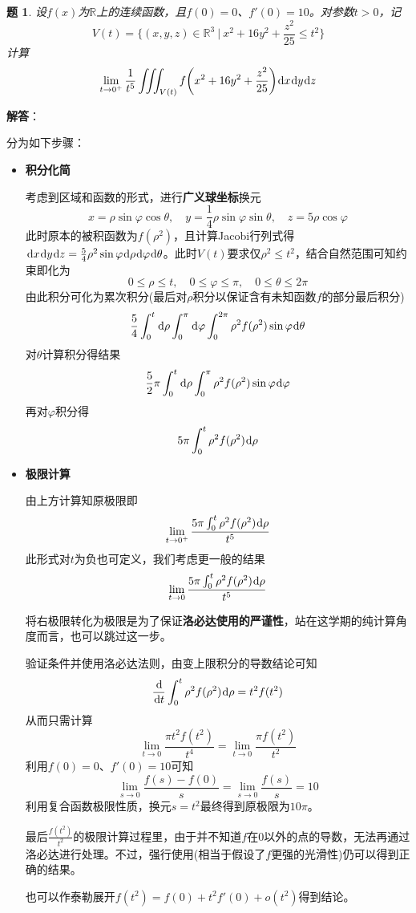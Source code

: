 \documentclass[a4paper,UTF8,fontset=windows,AutoFakeBold]{ctexart}
\newcommand*{\dr}{\hspace{0.07em}\mathrm{d}}
\newcommand*{\rb}{\mathbb{R}}
\newcommand*{\note}{\noindent *}
\theoremstyle{ex}
\newtheorem{exercise}{题}
\newcommand{\sol}[1]{{\vspace{5pt}\kaishu\noindent\textbf{解答}：\vspace{-3pt}
\begin{compactitem}
    \item[] #1
\end{compactitem}
}}
\begin{document}
\begin{framed}
\begin{exercise}
    设$f(x)$为$\rb$上的连续函数，且$f(0)=0$、$f'(0)=10$。对参数$t>0$，记
    $$V(t)=\bigg\{(x,y,z)\in\rb^3\ \bigg|\ x^2+16y^2+\frac{z^2}{25}\le t^2\bigg\}$$
    计算
    $$\lim_{t\to0^+}\frac{1}{t^5}\iiint_{V(t)}f\bigg(x^2+16y^2+\frac{z^2}{25}\bigg)\dr x\dr y\dr z$$
\end{exercise}
\sol{
    分为如下步骤：
    \begin{itemize}
        \item \textbf{积分化简}
        
        考虑到区域和函数的形式，进行\textbf{广义球坐标}换元
        $$x=\rho\sin\varphi\cos\theta,\quad y=\frac{1}{4}\rho\sin\varphi\sin\theta,\quad z=5\rho\cos\varphi$$
        此时原本的被积函数为$f(\rho^2)$，且计算Jacobi行列式得$\dr x\dr y\dr z=\frac{5}{4}\rho^2\sin\varphi\dr\rho\dr\varphi\dr\theta$。此时$V(t)$要求仅$\rho^2\le t^2$，结合自然范围可知约束即化为
        $$0\le\rho\le t,\quad0\le\varphi\le\pi,\quad0\le\theta\le2\pi$$
        由此积分可化为累次积分(最后对$\rho$积分以保证含有未知函数$f$的部分最后积分)
        $$\frac{5}{4}\int_0^t\dr\rho\int_0^\pi\dr\varphi\int_0^{2\pi}\rho^2f(\rho^2)\sin\varphi\dr\theta$$
        对$\theta$计算积分得结果
        $$\frac{5}{2}\pi\int_0^t\dr\rho\int_0^\pi\rho^2f(\rho^2)\sin\varphi\dr\varphi$$
        再对$\varphi$积分得
        $$5\pi\int_0^t\rho^2f(\rho^2)\dr\rho$$
        
        \item \textbf{极限计算}
        
        由上方计算知原极限即
        $$\lim_{t\to0^+}\frac{5\pi\int_0^t\rho^2f(\rho^2)\dr\rho}{t^5}$$
        此形式对$t$为负也可定义，我们考虑更一般的结果
        $$\lim_{t\to0}\frac{5\pi\int_0^t\rho^2f(\rho^2)\dr\rho}{t^5}$$

        \note 将右极限转化为极限是为了保证\textbf{洛必达使用的严谨性}，站在这学期的纯计算角度而言，也可以跳过这一步。

        验证条件并使用洛必达法则，由变上限积分的导数结论可知
        $$\frac{\dr}{\dr t}\int_0^t\rho^2f(\rho^2)\dr\rho=t^2f(t^2)$$
        从而只需计算
        $$\lim_{t\to0}\frac{\pi t^2f(t^2)}{t^4}=\lim_{t\to0}\frac{\pi f(t^2)}{t^2}$$
        利用$f(0)=0$、$f'(0)=10$可知
        $$\lim_{s\to0}\frac{f(s)-f(0)}{s}=\lim_{s\to0}\frac{f(s)}{s}=10$$
        利用复合函数极限性质，换元$s=t^2$最终得到原极限为$10\pi$。

        \note 最后$\frac{f(t^2)}{t^2}$的极限计算过程里，由于并不知道$f$在0以外的点的导数，无法再通过洛必达进行处理。不过，强行使用(相当于假设了$f$更强的光滑性)仍可以得到正确的结果。

        \note 也可以作泰勒展开$f(t^2)=f(0)+t^2f'(0)+o(t^2)$得到结论。
    \end{itemize}
}
\end{framed}
\end{document}
